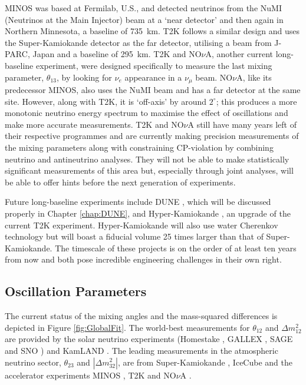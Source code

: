 MINOS was based at Fermilab, U.S., and detected neutrinos from the NuMI (Neutrinos at the Main Injector) beam at a `near detector' and then again in Northern Minnesota, a baseline of 735~km.  T2K follows a similar design and uses the Super-Kamiokande detector as the far detector, utilising a beam from J-PARC, Japan and a baseline of 295~km.  T2K and NO$\nu$A, another current long-baseline experiment, were designed specifically to measure the last mixing parameter, $\theta_{13}$, by looking for $\nu_e$ appearance in a $\nu_{\mu}$ beam.  NO$\nu$A, like its predecessor MINOS, also uses the NuMI beam and has a far detector at the same site.  However, along with T2K, it is `off-axis' by around $2^{\circ}$; this produces a more monotonic neutrino energy spectrum to maximise the effect of oscillations and make more accurate measurements.  T2K and NO$\nu$A still have many years left of their respective programmes and are currently making precision measurements of the mixing parameters along with constraining CP-violation by combining neutrino and antineutrino analyses.  They will not be able to make statistically significant measurements of this area but, especially through joint analyses, will be able to offer hints before the next generation of experiments.

Future long-baseline experiments include DUNE \cite{}, which will be discussed properly in Chapter \ref{chap:DUNE}, and Hyper-Kamiokande \cite{HyperKamiokande2015}, an upgrade of the current T2K experiment.  Hyper-Kamiokande will also use water Cherenkov technology but will boast a fiducial volume 25 times larger than that of Super-Kamiokande.  The timescale of these projects is on the order of at least ten years from now and both pose incredible engineering challenges in their own right.

\subsection{Oscillation Parameters}\label{sec:OscillationParameters}

The current status of the mixing angles and the mass-squared differences is depicted in Figure \ref{fig:GlobalFit}.  The world-best measurements for $\theta_{12}$ and $\Delta m^2_{12}$ are provided by the solar neutrino experiments (Homestake \cite{Cleveland1995}, GALLEX \cite{Gallex2010}, SAGE \cite{Sage2009} and SNO \cite{SNO2013}) and KamLAND \cite{KamLAND2013}.  The leading measurements in the atmospheric neutrino sector, $\theta_{23}$ and $|\Delta m_{32}^2|$, are from Super-Kamiokande \cite{SuperKamiokande2010}, IceCube \cite{IceCube2015} and the accelerator experiments MINOS \cite{MINOS2013,MINOS2013b}, T2K \cite{T2Knumu2014} and NO$\nu$A \cite{NOvAnumu2016}.

